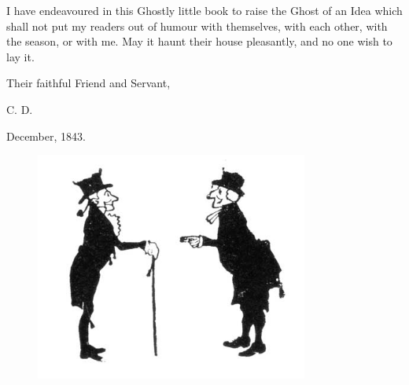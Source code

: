 \documentclass[paper=5.5in:8.5in,BCOR=5mm,twoside,DIV=calc,12pt,usegeometry]{scrbook} %
\begin{document}
\lettrine[loversize=.85]{I}{} have endeavoured in this Ghostly little book to raise the Ghost of an Idea which shall not put my readers out of humour with themselves, with each other, with the season, or with me. May it haunt their house pleasantly, and no one wish to lay it.

Their faithful Friend and Servant,

C. D.

December, 1843.
\begin{figure}[h]
\centering
\includegraphics[width=0.8\textwidth]{gs007}
\end{figure}
\end{document}
